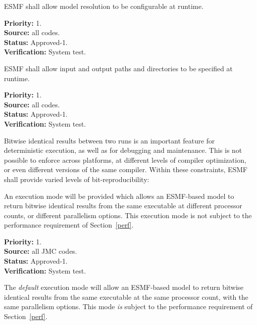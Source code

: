 ESMF shall allow model resolution to be configurable at runtime.
\begin{reqlist}
{\bf Priority:} 1. \\
{\bf Source:} all codes. \\
{\bf Status:} Approved-1. \\
{\bf Verification:} System test.
\end{reqlist}

ESMF shall allow input and output paths and directories to be specified
at runtime.
\label{req:gr:Configurable_paths_and_directories}
\begin{reqlist}
{\bf Priority:} 1. \\
{\bf Source:} all codes. \\
{\bf Status:} Approved-1. \\
{\bf Verification:} System test.
\end{reqlist}


Bitwise identical results between two runs is an important feature for
deterministic execution, as well as for debugging and maintenance.
This is not possible to enforce across platforms, at different levels
of compiler optimization, or even different versions of the same
compiler. Within these constraints, ESMF shall provide varied levels
of bit-reproducibility:


An execution mode will be provided which allows an ESMF-based model to
return bitwise identical results from the same executable at different
processor counts, or different parallelism options. This execution
mode is not subject to the performance requirement of Section~\ref{perf}.

\begin{reqlist}
{\bf Priority:} 1. \\
{\bf Source:} all JMC codes. \\
{\bf Status:} Approved-1. \\
{\bf Verification:} System test.
\end{reqlist}


The \emph{default} execution mode will allow an ESMF-based model to
return bitwise identical results from the same executable at the same
processor count, with the same parallelism options. This mode
\emph{is} subject to the performance requirement of
Section~\ref{perf}.

